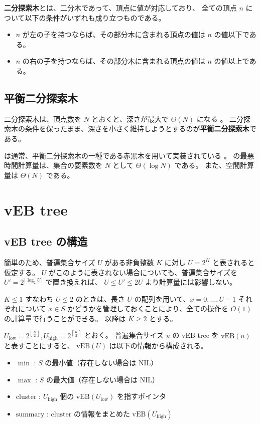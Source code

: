 \documentclass[dvipdfmx,a4j,10pt]{jarticle}
\begin{document}
\textbf{二分探索木}とは、二分木であって、頂点に値が対応しており、
全ての頂点 $n$ について以下の条件がいずれも成り立つものである。

\begin{itemize}
  \item $n$ が左の子を持つならば、その部分木に含まれる頂点の値は $n$ の値以下である。
  \item $n$ の右の子を持つならば、その部分木に含まれる頂点の値は $n$ の値以上である。
\end{itemize}

\subsection{平衡二分探索木}

二分探索木は、頂点数を $N$ とおくと、深さが最大で $\Theta(N)$ になる \cite{Data}。
二分探索木の条件を保ったまま、深さを小さく維持しようとするのが\textbf{平衡二分探索木}である。

 は通常、平衡二分探索木の一種である赤黒木を用いて実装されている \cite{CppReference}。
 の最悪時間計算量は、集合の要素数を $N$ として $\Theta(\log N)$ である。
また、空間計算量は $\Theta(N)$ である。

\section{vEB tree}

\subsection{vEB tree の構造}

簡単のため、普遍集合サイズ $U$ がある非負整数 $K$ に対し $U = 2^K$ と表されると仮定する。
$U$ がこのように表されない場合についても、普遍集合サイズを $U' = 2^{\lceil \log_2 U \rceil}$ で置き換えれば、
$U \leq U' \leq 2U$ より計算量には影響しない。

$K \leq 1$ すなわち $U \leq 2$ のときは、長さ $U$ の配列を用いて、$x = 0, \dots, U - 1$ それぞれについて $x \in S$ かどうかを管理しておくことにより、全ての操作を $O(1)$ の計算量で行うことができる。
以降は $K \geq 2$ とする。

$U_{\mathrm{low}} = 2^{\left\lfloor \frac{K}{2} \right\rfloor}, 
U_{\mathrm{high}} = 2^{\left\lceil \frac{K}{2} \right\rceil}$ とおく。
普遍集合サイズ $u$ の vEB tree を $\mathrm{vEB}(u)$ と表すことにすると、
$\mathrm{vEB}(U)$ は以下の情報から構成される。

\begin{itemize}
  \item $\min$ : $S$ の最小値（存在しない場合は $\mathrm{NIL}$）
  \item $\max$ : $S$ の最大値（存在しない場合は $\mathrm{NIL}$）
  \item $\mathrm{cluster}$ : $U_{\mathrm{high}}$ 個の $\mathrm{vEB}(U_{\mathrm{low}})$ を指すポインタ
  \item $\mathrm{summary}$ : $\mathrm{cluster}$ の情報をまとめた $\mathrm{vEB}(U_{\mathrm{high}})$
\end{itemize}
\end{document}
